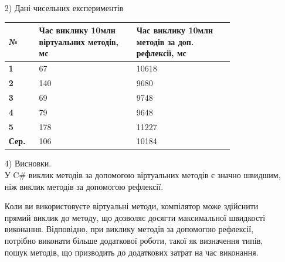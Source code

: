 \documentclass[oneside,14pt]{extarticle}
\begin{document}
\begin{normalsize}
\begin{enumerate}
		\item[2)] Дані чисельних експериментів
		\begin{table}[H]
			\centering
			\renewcommand*\arraystretch{1.3}
			\begin{tabular}{|p{0.10\linewidth}|p{0.35\linewidth}|p{0.35\linewidth}|}
				\hline
				\textbf{№} & \textbf{Час виклику 10млн віртуальних методів, мс} & \textbf{Час виклику 10млн методів за доп. рефлексії, мс}\\
				\hline
				\textbf{1} & 67 & 10618  \\
				\hline
				\textbf{2} & 140 & 9680  \\
				\hline
				\textbf{3} & 69 & 9748  \\
				\hline
				\textbf{4} & 79 & 9648 \\
				\hline
				\textbf{5} & 178 & 11227 \\
				\hline
				\textbf{Сер.} & 106 & 10184  \\
				\hline
			\end{tabular}
		\end{table}
		
		\item[4)] Висновки. \\
		У C\# виклик методів за допомогою віртуальних методів є значно швидшим, ніж виклик методів за допомогою рефлексії.
		
		Коли ви використовуєте віртуальні методи, компілятор може здійснити прямий виклик до методу, що дозволяє досягти максимальної швидкості виконання. Відповідно, при виклику методів за допомогою рефлексії, потрібно виконати більше додаткової роботи, такої як визначення типів, пошук методів, що призводить до додаткових затрат на час виконання.
	\end{enumerate}
	

\end{normalsize}
\end{document}
